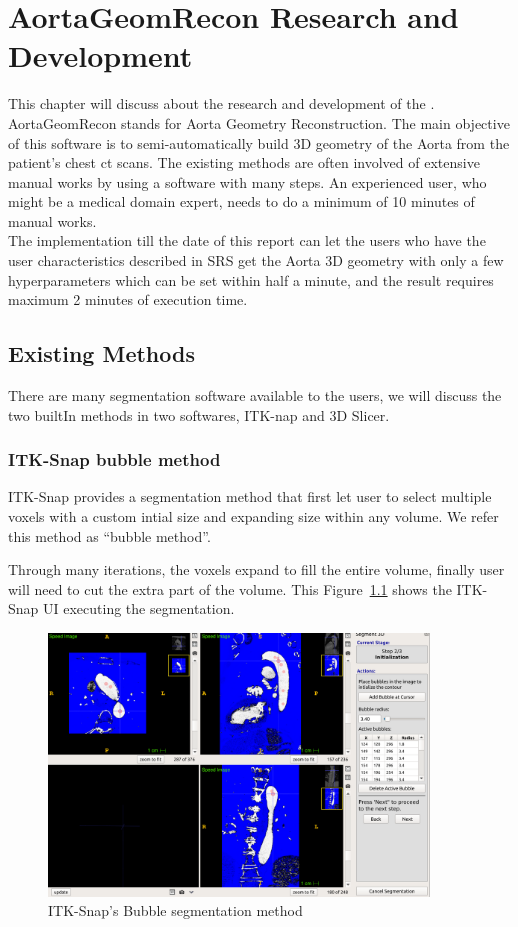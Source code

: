 \chapter{AortaGeomRecon Research and Development}
This chapter will discuss about the research and development of the \progname{}. \\
AortaGeomRecon stands for Aorta Geometry Reconstruction. The main objective of this software is to semi-automatically build 3D geometry of the Aorta from the patient's chest ct scans.  The existing methods are often involved of extensive manual works by using a software with many steps. An experienced user, who might be a medical domain expert, needs to do a minimum of 10 minutes of manual works. \\
The implementation till the date of this report can let the users who have the user characteristics described in SRS \citep{SRS} get the Aorta 3D geometry with only a few hyperparameters which can be set within half a minute, and the result requires maximum 2 minutes of execution time. \\


\section{Existing Methods}
There are many segmentation software available to the users, we will discuss the two builtIn methods in two softwares, ITK-nap and 3D Slicer.

\subsection{ITK-Snap bubble method} 
\indent
ITK-Snap provides a segmentation method that first let user to select multiple voxels with a custom intial size and expanding size within any volume. We refer this method as ``bubble method''.

Through many iterations, the voxels expand to fill the entire volume, finally user will need to cut the extra part of the volume. This Figure~\ref{fig_ITK} shows the ITK-Snap UI executing the segmentation.

\begin{figure}[ht]
    \centering
    \includegraphics[width=0.9\textwidth]{figures/AGR/bubbles.png}
    \caption[ITK-Snap's Bubble segmentation UI]{ITK-Snap's Bubble segmentation method}
    \label{fig_ITK}
\end{figure}

